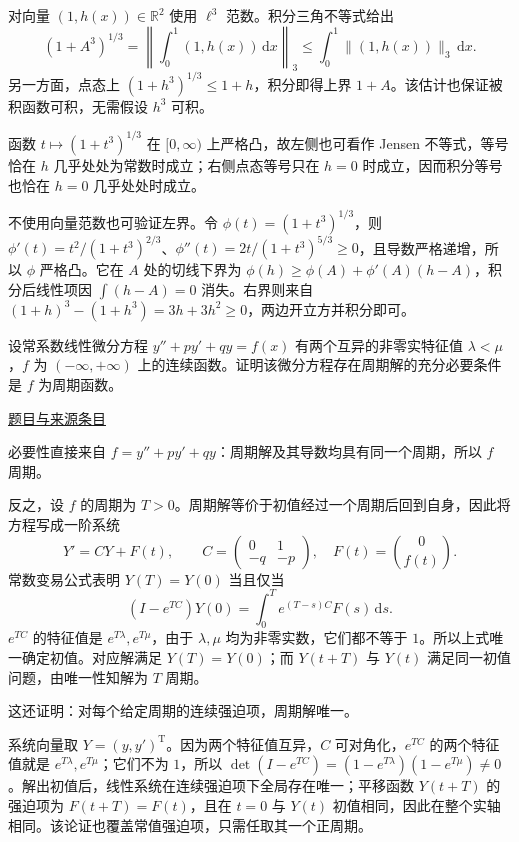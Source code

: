 \documentclass[12pt,fontset=fandol]{ctexart}
\begin{document}
\begin{solve}\label{ans:fin17-high:8}

对向量 $(1,h(x))\in\mathbb R^2$ 使用 $\ell^3$ 范数。积分三角不等式给出
\[
(1+A^3)^{1/3}
=\left\|\int_0^1(1,h(x))\,\mathrm dx\right\|_3
\le\int_0^1\|(1,h(x))\|_3\,\mathrm dx.
\]
另一方面，点态上 $(1+h^3)^{1/3}\le1+h$，积分即得上界 $1+A$。该估计也保证被积函数可积，无需假设 $h^3$ 可积。

函数 $t\mapsto(1+t^3)^{1/3}$ 在 $[0,\infty)$ 上严格凸，故左侧也可看作 Jensen 不等式，等号恰在 $h$ 几乎处处为常数时成立；右侧点态等号只在 $h=0$ 时成立，因而积分等号也恰在 $h=0$ 几乎处处时成立。

不使用向量范数也可验证左界。令 $\phi(t)=(1+t^3)^{1/3}$，则 $\phi'(t)=t^2/(1+t^3)^{2/3}$、$\phi''(t)=2t/(1+t^3)^{5/3}\ge0$，且导数严格递增，所以 $\phi$ 严格凸。它在 $A$ 处的切线下界为 $\phi(h)\ge\phi(A)+\phi'(A)(h-A)$，积分后线性项因 $\int(h-A)=0$ 消失。右界则来自 $(1+h)^3-(1+h^3)=3h+3h^2\ge0$，两边开立方并积分即可。

\end{solve}

\begin{example}\label{ex:fin17-low:10}\label{pr:fin17-low:10}

设常系数线性微分方程 $y''+py'+qy=f(x)$ 有两个互异的非零实特征值 $\lambda<\mu$，$f$ 为 $(-\infty,+\infty)$ 上的连续函数。证明该微分方程存在周期解的充分必要条件是 $f$ 为周期函数。

\par\href{https://github.com/lzxcr/cmc-mathematics/blob/64916fa1fdbc3e444a652eca204d5669058ee321/src/problems/finals/17/12.md}{题目与来源条目}

\end{example}

\begin{solve}\label{ans:fin17-low:10}

必要性直接来自 $f=y''+py'+qy$：周期解及其导数均具有同一个周期，所以 $f$ 周期。

反之，设 $f$ 的周期为 $T>0$。周期解等价于初值经过一个周期后回到自身，因此将方程写成一阶系统
\[
Y'=CY+F(t),\qquad C=\begin{pmatrix}0&1\\-q&-p\end{pmatrix},\quad
F(t)=\binom0{f(t)}.
\]
常数变易公式表明 $Y(T)=Y(0)$ 当且仅当
\[
(I-e^{TC})Y(0)=\int_0^Te^{(T-s)C}F(s)\,\mathrm ds.
\]
$e^{TC}$ 的特征值是 $e^{T\lambda},e^{T\mu}$，由于 $\lambda,\mu$ 均为非零实数，它们都不等于 $1$。所以上式唯一确定初值。对应解满足 $Y(T)=Y(0)$；而 $Y(t+T)$ 与 $Y(t)$ 满足同一初值问题，由唯一性知解为 $T$ 周期。

这还证明：对每个给定周期的连续强迫项，周期解唯一。

系统向量取 $Y=(y,y')^{\mathrm T}$。因为两个特征值互异，$C$ 可对角化，$e^{TC}$ 的两个特征值就是 $e^{T\lambda},e^{T\mu}$；它们不为 $1$，所以 $\det(I-e^{TC})=(1-e^{T\lambda})(1-e^{T\mu})\ne0$。解出初值后，线性系统在连续强迫项下全局存在唯一；平移函数 $Y(t+T)$ 的强迫项为 $F(t+T)=F(t)$，且在 $t=0$ 与 $Y(t)$ 初值相同，因此在整个实轴相同。该论证也覆盖常值强迫项，只需任取其一个正周期。

\end{solve}
\end{document}
